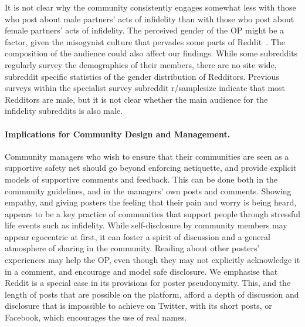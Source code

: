 It is not clear why the community consistently engages somewhat less with those who post about male partners' acts of infidelity than with those who post about female partners' acts of infidelity. The perceived gender of the OP might be a factor, given the misogynist culture that pervades some parts of Reddit~\cite{massanari_gamergate_2017}. The composition of the audience could also affect our findings. While some subreddits regularly survey the demographics of their members, there are no site wide, subreddit specific statistics of the gender distribution of Redditors. Previous surveys within the specialist survey subreddit r/samplesize indicate that most Redditors are male, but it is not clear whether the main audience for the infidelity subreddits is also male. 

\paragraph{Implications for Community Design and Management.} Community managers who wish to ensure that their communities are seen as a supportive safety net should go beyond enforcing netiquette, and provide explicit models of supportive comments and feedback. This can be done both in the community guidelines, and in the managers' own posts and comments. Showing empathy, and giving posters the feeling that their pain and worry is being heard, appears to be a key practice of communities that support people through stressful life events such as infidelity. While self-disclosure by community members may appear egocentric at first, it can foster a spirit of discussion and a general atmosphere of sharing in the community. Reading about other posters' experiences may help the OP, even though they may not explicitly acknowledge it in a comment, and encourage and model safe disclosure. We emphasise that Reddit is a special case in its provisions for poster pseudonymity. This, and the length of posts that are possible on the platform, afford a depth of discussion and disclosure that is impossible to achieve on Twitter, with its short posts, or Facebook, which encourages the use of real names.




